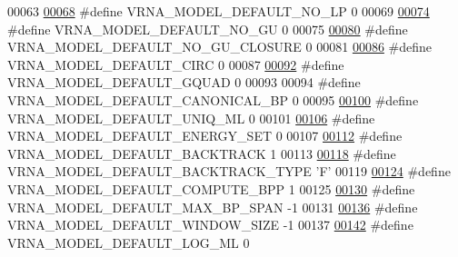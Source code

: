 \begin{DoxyCode}
00063 
\hypertarget{model_8h_source_l00068}{}\hyperlink{group__model__details_gab72462726dd60ed0d43339bbf7ee08ad}{00068} \textcolor{preprocessor}{#define VRNA\_MODEL\_DEFAULT\_NO\_LP          0}
00069 
\hypertarget{model_8h_source_l00074}{}\hyperlink{group__model__details_ga34702f7d14d38b877ba8e475281e97e2}{00074} \textcolor{preprocessor}{#define VRNA\_MODEL\_DEFAULT\_NO\_GU          0}
00075 
\hypertarget{model_8h_source_l00080}{}\hyperlink{group__model__details_ga5308de46faaca4b9fd16045864901ee7}{00080} \textcolor{preprocessor}{#define VRNA\_MODEL\_DEFAULT\_NO\_GU\_CLOSURE  0}
00081 
\hypertarget{model_8h_source_l00086}{}\hyperlink{group__model__details_ga22059033db7bcd875c51fec32425490a}{00086} \textcolor{preprocessor}{#define VRNA\_MODEL\_DEFAULT\_CIRC           0}
00087 
\hypertarget{model_8h_source_l00092}{}\hyperlink{group__model__details_ga793ed812e86f43799b14b2deee917f23}{00092} \textcolor{preprocessor}{#define VRNA\_MODEL\_DEFAULT\_GQUAD          0}
00093 
00094 \textcolor{preprocessor}{#define VRNA\_MODEL\_DEFAULT\_CANONICAL\_BP   0}
00095 
\hypertarget{model_8h_source_l00100}{}\hyperlink{group__model__details_ga63f6006a02ba2d89148441f406c309e7}{00100} \textcolor{preprocessor}{#define VRNA\_MODEL\_DEFAULT\_UNIQ\_ML        0}
00101 
\hypertarget{model_8h_source_l00106}{}\hyperlink{group__model__details_ga6fcf6b2d0f89256cdbd166486c9b6e1e}{00106} \textcolor{preprocessor}{#define VRNA\_MODEL\_DEFAULT\_ENERGY\_SET     0}
00107 
\hypertarget{model_8h_source_l00112}{}\hyperlink{group__model__details_ga3fda8006ab84baf817bd8e5ccbc6bb35}{00112} \textcolor{preprocessor}{#define VRNA\_MODEL\_DEFAULT\_BACKTRACK      1}
00113 
\hypertarget{model_8h_source_l00118}{}\hyperlink{group__model__details_gad0e81fcaca53c4a826c68e0796de2afb}{00118} \textcolor{preprocessor}{#define VRNA\_MODEL\_DEFAULT\_BACKTRACK\_TYPE 'F'}
00119 
\hypertarget{model_8h_source_l00124}{}\hyperlink{group__model__details_ga1d6cd5051940b126c248147c011bac6c}{00124} \textcolor{preprocessor}{#define VRNA\_MODEL\_DEFAULT\_COMPUTE\_BPP    1}
00125 
\hypertarget{model_8h_source_l00130}{}\hyperlink{group__model__details_ga7cb6f4ae8fdebff6746a4410814f2977}{00130} \textcolor{preprocessor}{#define VRNA\_MODEL\_DEFAULT\_MAX\_BP\_SPAN    -1}
00131 
\hypertarget{model_8h_source_l00136}{}\hyperlink{group__model__details_ga8de04a9cb57e811e313b0f9f207f6bdb}{00136} \textcolor{preprocessor}{#define VRNA\_MODEL\_DEFAULT\_WINDOW\_SIZE    -1}
00137 
\hypertarget{model_8h_source_l00142}{}\hyperlink{group__model__details_ga938f68463e84fe060aa6502f428a517d}{00142} \textcolor{preprocessor}{#define VRNA\_MODEL\_DEFAULT\_LOG\_ML         0}

\end{DoxyCode}
